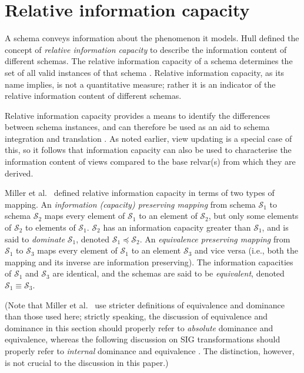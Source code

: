 \documentclass{sig-alternate-05-2015}
\newcommand{\SC}[1]{\ensuremath{\mathcal{S}_{#1}}}
\newcommand{\Dominates}[2]{\ensuremath{#2 \preceq #1}}
\newcommand{\Equivalent}[2]{\ensuremath{#1 \equiv #2}}
\begin{document}

\newpage

\section{Relative information capacity}
\label{sec-info-capacity}

\noindent A schema conveys information about the phenomenon it models. Hull \cite{Hull.R-1986a-Relative} defined the concept of \emph{relative information capacity} to describe the information content of different schemas. The relative information capacity of a schema determines the set of all valid instances of that schema \cite{Hull.R-1986a-Relative,Miller.R-1994a-PhD,Miller.R-1993a-Information}. Relative information capacity, as its name implies, is not a quantitative measure; rather it is an indicator of the relative information content of different schemas.

Relative information capacity provides a means to identify the differences between schema instances, and can therefore be used as an aid to schema integration and translation \cite{Miller.R-1994a-PhD}. As noted earlier, view updating is a special case of this, so it follows that information capacity can also be used to characterise the information content of views compared to the base relvar(s) from which they are derived.

Miller et al.\ \cite{Miller.R-1993a-Information} defined relative information capacity in terms of two types of mapping. An \emph{information (capacity) preserving mapping} from schema \(\SC{1}\) to schema \(\SC{2}\) maps every element of \(\SC{1}\) to an element of \(\SC{2}\), but only some elements of \(\SC{2}\) to elements of \(\SC{1}\). \(\SC{2}\) has an information capacity greater than \(\SC{1}\), and is said to \emph{dominate} \(\SC{1}\), denoted \Dominates{\SC{2}}{\SC{1}}. An \emph{equivalence preserving mapping} from \(\SC{1}\) to \(\SC{3}\) maps every element of \(\SC{1}\) to an element \(\SC{3}\) and vice versa (i.e., both the mapping and its inverse are information preserving). The information capacities of \(\SC{1}\) and \(\SC{3}\) are identical, and the schemas are said to be \emph{equivalent}, denoted \Equivalent{\SC{1}}{\SC{3}}.

(Note that Miller et al.\ \cite{Miller.R-1994a-Schema} use stricter definitions of equivalence and dominance than those used here; strictly speaking, the discussion of equivalence and dominance in this section should properly refer to \emph{absolute} dominance and equivalence, whereas the following discussion on SIG transformations should properly refer to \emph{internal} dominance and equivalence \cite{Miller.R-1994a-Schema}. The distinction, however, is not crucial to the discussion in this paper.)
\end{document}
